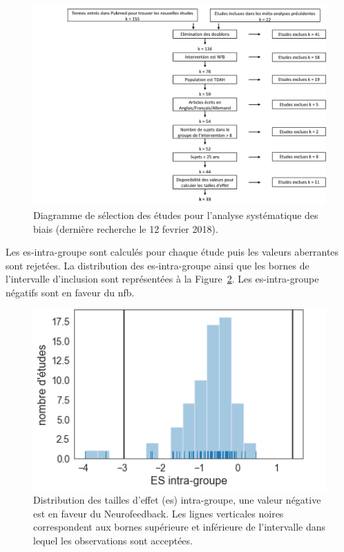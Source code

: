 \newpage\
\begin{figure}[h!]
  \centering
	\includegraphics[width=1.0\linewidth]{figures/chapter-3/factors-selection-studies} 
  \caption{Diagramme de sélection des études pour l'analyse systématique des biais (dernière recherche le 12 fevrier 2018).}
  \label{Figure:factors_pipeline_selection_studies}
\end{figure}

Les \gls{es}-intra-groupe sont calculés pour chaque étude puis les valeurs aberrantes sont rejetées. La distribution des \gls{es}-intra-groupe ainsi que les bornes 
de l'intervalle d'inclusion sont représentées à la Figure~\ref{Figure:distribution_ES_within}. Les \gls{es}-intra-groupe négatifs sont en faveur du \gls{nfb}.

\begin{figure}[h!]
  \centering
	\includegraphics[width=0.5\linewidth]{figures/chapter-3/distribution-ES-within} 
  \caption{Distribution des tailles d'effet (\gls{es}) intra-groupe, une valeur négative est en faveur du Neurofeedback. Les lignes verticales noires correspondent aux bornes supérieure et 
	inférieure de l'intervalle dans lequel les observations sont acceptées.}
  \label{Figure:distribution_ES_within}
\end{figure}

